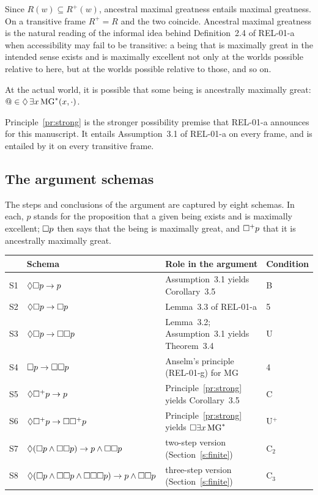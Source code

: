 \documentclass{situationist-preprint}
\newcommand{\MG}{\mathrm{MG}}
\newcommand{\MGs}{\mathrm{MG}^{*}}
\newcommand{\Rp}{R^{+}}
\newcommand{\nplus}{\nec^{+}}
\begin{document}
Since $R(w) \subseteq \Rp(w)$, ancestral maximal greatness entails maximal greatness. On a transitive frame $\Rp = R$ and the two coincide. Ancestral maximal greatness is the natural reading of the informal idea behind Definition~2.4 of REL-01-a when accessibility may fail to be transitive: a being that is maximally great in the intended sense exists and is maximally excellent not only at the worlds possible relative to here, but at the worlds possible relative to those, and so on.

\begin{principle}\label{pr:strong}
At the actual world, it is possible that some being is ancestrally maximally great: $@ \in \pos\,\exists x\,\MGs(x,\cdot)$.
\end{principle}

Principle~\ref{pr:strong} is the stronger possibility premise that REL-01-a announces for this manuscript. It entails Assumption~3.1 of REL-01-a on every frame, and is entailed by it on every transitive frame.

\subsection{The argument schemas}

The steps and conclusions of the argument are captured by eight schemas. In each, $p$ stands for the proposition that a given being exists and is maximally excellent; $\mathord{\Box} p$ then says that the being is maximally great, and $\nplus p$ that it is ancestrally maximally great.

\begin{center}\footnotesize
\begin{tabular}{@{}llll@{}}
\toprule
& Schema & Role in the argument & Condition \\
\midrule
S1 & $\mathord{\Diamond}\mathord{\Box} p \to p$ & Assumption~3.1 yields Corollary~3.5 & B \\
S2 & $\mathord{\Diamond}\mathord{\Box} p \to \mathord{\Box} p$ & Lemma~3.3 of REL-01-a & 5 \\
S3 & $\mathord{\Diamond}\mathord{\Box} p \to \mathord{\Box}\mathord{\Box} p$ & Lemma~3.2; Assumption~3.1 yields Theorem~3.4 & U \\
S4 & $\mathord{\Box} p \to \mathord{\Box}\mathord{\Box} p$ & Anselm's principle (REL-01-g) for $\MG$ & 4 \\
S5 & $\pos\nplus p \to p$ & Principle~\ref{pr:strong} yields Corollary~3.5 & C \\
S6 & $\pos\nplus p \to \nec\nplus p$ & Principle~\ref{pr:strong} yields $\nec\exists x\,\MGs$ & U$^+$ \\
S7 & $\mathord{\Diamond}(\mathord{\Box} p \wedge \mathord{\Box}\mathord{\Box} p) \to p \wedge \mathord{\Box}\mathord{\Box} p$ & two-step version (Section~\ref{s:finite}) & C$_2$ \\
S8 & $\mathord{\Diamond}(\mathord{\Box} p \wedge \mathord{\Box}\mathord{\Box} p \wedge \mathord{\Box}\mathord{\Box}\mathord{\Box} p) \to p \wedge \mathord{\Box}\mathord{\Box} p$ & three-step version (Section~\ref{s:finite}) & C$_3$ \\
\bottomrule
\end{tabular}
\end{center}
\end{document}
